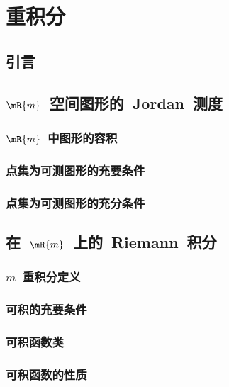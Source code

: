

\chapter{重积分}\label{ch:20}
\section{引\emspace 言}
\section{$\mR{m}$~空间图形的~Jordan~测度}
\subsection{$\mR{m}$~中图形的容积}
\subsection{点集为可测图形的充要条件}
\subsection{点集为可测图形的充分条件}
\begin{exercise}
\item
\end{exercise}
\section{在~$\mR{m}$~上的~Riemann~积分}
\subsection{$m$~重积分定义}
\subsection{可积的充要条件}
\subsection{可积函数类}
\subsection{可积函数的性质}
\begin{exercise}
\item
\end{exercise}
